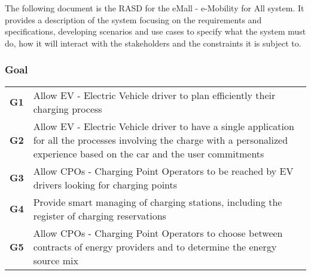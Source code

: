 The following document is the RASD for the eMall - e-Mobility for All system. It provides
a description of the system focusing on the requirements and specifications, developing scenarios and use cases
to specify what the system must do, how it will interact with the stakeholders and the constraints it is subject to.

\subsubsection{Goal}
\begin{table}[H]
    \begin{tabularx}{\textwidth}{cX}
        \toprule
        \textbf{G1} & Allow EV - Electric Vehicle driver to plan efficiently their charging process                   \\
        \textbf{G2} & Allow EV - Electric Vehicle driver to have a single application for all the processes involving
        the charge with a personalized experience based on the car and the user commitments                           \\
        \textbf{G3} & Allow CPOs - Charging Point Operators to be reached by EV drivers looking for charging points   \\
        \textbf{G4} & Provide smart managing of charging stations, including the register of charging reservations    \\
        \textbf{G5} & Allow CPOs - Charging Point Operators to choose between contracts of energy providers and
        to determine the energy source mix                                                                            \\ \bottomrule
    \end{tabularx}
\end{table}

